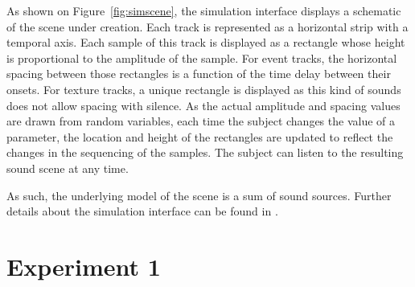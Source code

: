 \documentclass[12pt]{elsarticle}
\newcommand{\cf}{cf.}
\begin{document}

As shown on Figure~\ref{fig:simscene}, the simulation interface displays a schematic of the scene under creation. Each track is represented as a horizontal strip with a temporal axis. Each sample of this track is displayed as a rectangle whose height is proportional to the amplitude of the sample. For event tracks, the horizontal spacing between those rectangles is a function of the time delay between their onsets. For texture tracks, a unique rectangle is displayed as this kind of sounds does not allow spacing with silence. As the actual amplitude and spacing values are drawn from random variables, each time the subject changes the value of a parameter, the location and height of the rectangles are updated to reflect the changes in the sequencing of the samples. The subject can listen to the resulting sound scene at any time.


As such, the underlying model of the scene is a sum of sound sources. Further details about the simulation interface can be found in \cite{rossignol2015simscene}.




\section{Experiment 1}
\label{sec:simulation}
\end{document}
